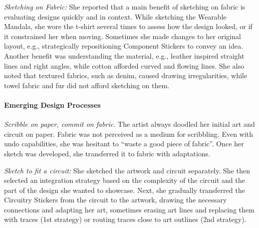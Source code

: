 \documentclass[header.tex]{subfiles}
\begin{document}




\textit{Sketching on Fabric:} She reported that a main benefit of sketching on fabric is evaluating designs quickly and in context. While sketching the Wearable Mandala, she wore the t-shirt several times to assess how the design looked, or if it constrained her when moving. Sometimes she made changes to her original layout, e.g., strategically repositioning Component Stickers to convey an idea. Another benefit was understanding the material, e.g., leather inspired straight lines and right angles, while cotton afforded curved and flowing lines. She also noted that textured fabrics, such as denim, caused drawing irregularities, while towel fabric and fur did not afford sketching on them. 





\paragraph{Emerging Design Processes}
\textit{Scribble on paper, commit on fabric}. The artist always doodled her initial art and circuit on paper. Fabric was not perceived as a medium for scribbling. Even with undo capabilities, she was hesitant to ``waste a good piece of fabric''. Once her sketch was developed, she transferred it to fabric with adaptations.

\textit{Sketch to fit a circuit:} She sketched the artwork and circuit separately. She then selected an integration strategy based on the complexity of the circuit and the part of the design she wanted to showcase. Next, she gradually transferred the Circuitry Stickers from the circuit to the artwork, drawing the necessary connections and adapting her art, sometimes erasing art lines and replacing them with traces (1st strategy) or routing traces close to art outlines (2nd strategy).

\end{document}
